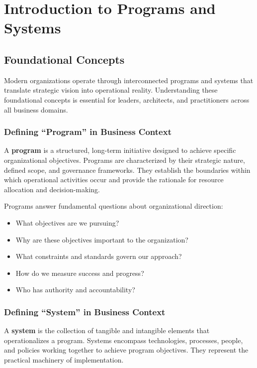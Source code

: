 \documentclass[11pt,letterpaper]{article}
\begin{document}
\section{Introduction to Programs and Systems}

\subsection{Foundational Concepts}

Modern organizations operate through interconnected programs and systems that translate strategic vision into operational reality. Understanding these foundational concepts is essential for leaders, architects, and practitioners across all business domains.

\subsubsection{Defining ``Program'' in Business Context}

A \textbf{program} is a structured, long-term initiative designed to achieve specific organizational objectives. Programs are characterized by their strategic nature, defined scope, and governance frameworks. They establish the boundaries within which operational activities occur and provide the rationale for resource allocation and decision-making.

Programs answer fundamental questions about organizational direction:

\begin{itemize}[leftmargin=2em]
    \item What objectives are we pursuing?
    \item Why are these objectives important to the organization?
    \item What constraints and standards govern our approach?
    \item How do we measure success and progress?
    \item Who has authority and accountability?
\end{itemize}

\subsubsection{Defining ``System'' in Business Context}

A \textbf{system} is the collection of tangible and intangible elements that operationalizes a program. Systems encompass technologies, processes, people, and policies working together to achieve program objectives. They represent the practical machinery of implementation.
\end{document}

